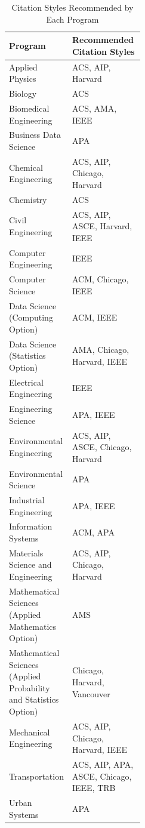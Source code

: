 \begin{table}
\centering
\caption{Citation Styles Recommended by Each Program}
\label{tab:phd-styles}
\begin{tabularx}{\linewidth}{>{\raggedright\arraybackslash}p{0.45\linewidth}X}
\toprule
\textbf{Program} & \textbf{Recommended Citation Styles} \\
\midrule
Applied Physics & ACS, AIP, Harvard \\
Biology & ACS \\
Biomedical Engineering & ACS, AMA, IEEE \\
Business Data Science & APA \\
Chemical Engineering & ACS, AIP, Chicago, Harvard \\
Chemistry & ACS \\
Civil Engineering & ACS, AIP, ASCE, Harvard, IEEE \\
Computer Engineering & IEEE \\
Computer Science & ACM, Chicago, IEEE \\
Data Science (Computing Option) & ACM, IEEE \\
Data Science (Statistics Option) & AMA, Chicago, Harvard, IEEE \\
Electrical Engineering & IEEE \\
Engineering Science & APA, IEEE \\
Environmental Engineering & ACS, AIP, ASCE, Chicago, Harvard \\
Environmental Science & APA \\
Industrial Engineering & APA, IEEE \\
Information Systems & ACM, APA \\
Materials Science and Engineering & ACS, AIP, Chicago, Harvard \\
Mathematical Sciences (Applied Mathematics Option) & AMS \\
Mathematical Sciences (Applied Probability and Statistics Option) & Chicago, Harvard, Vancouver \\
Mechanical Engineering & ACS, AIP, Chicago, Harvard, IEEE \\
Transportation & ACS, AIP, APA, ASCE, Chicago, IEEE, TRB \\
Urban Systems & APA \\
\bottomrule
\end{tabularx}
\end{table}

